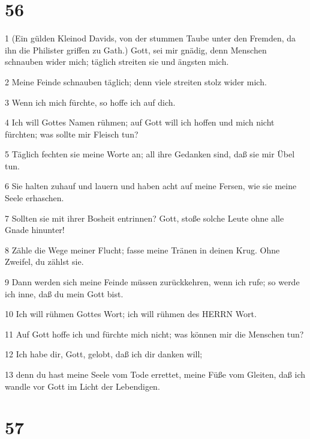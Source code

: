 \chapter{56}

\par 1 (Ein gülden Kleinod Davids, von der stummen Taube unter den Fremden, da ihn die Philister griffen zu Gath.) Gott, sei mir gnädig, denn Menschen schnauben wider mich; täglich streiten sie und ängsten mich.
\par 2 Meine Feinde schnauben täglich; denn viele streiten stolz wider mich.
\par 3 Wenn ich mich fürchte, so hoffe ich auf dich.
\par 4 Ich will Gottes Namen rühmen; auf Gott will ich hoffen und mich nicht fürchten; was sollte mir Fleisch tun?
\par 5 Täglich fechten sie meine Worte an; all ihre Gedanken sind, daß sie mir Übel tun.
\par 6 Sie halten zuhauf und lauern und haben acht auf meine Fersen, wie sie meine Seele erhaschen.
\par 7 Sollten sie mit ihrer Bosheit entrinnen? Gott, stoße solche Leute ohne alle Gnade hinunter!
\par 8 Zähle die Wege meiner Flucht; fasse meine Tränen in deinen Krug. Ohne Zweifel, du zählst sie.
\par 9 Dann werden sich meine Feinde müssen zurückkehren, wenn ich rufe; so werde ich inne, daß du mein Gott bist.
\par 10 Ich will rühmen Gottes Wort; ich will rühmen des HERRN Wort.
\par 11 Auf Gott hoffe ich und fürchte mich nicht; was können mir die Menschen tun?
\par 12 Ich habe dir, Gott, gelobt, daß ich dir danken will;
\par 13 denn du hast meine Seele vom Tode errettet, meine Füße vom Gleiten, daß ich wandle vor Gott im Licht der Lebendigen.

\chapter{57}

